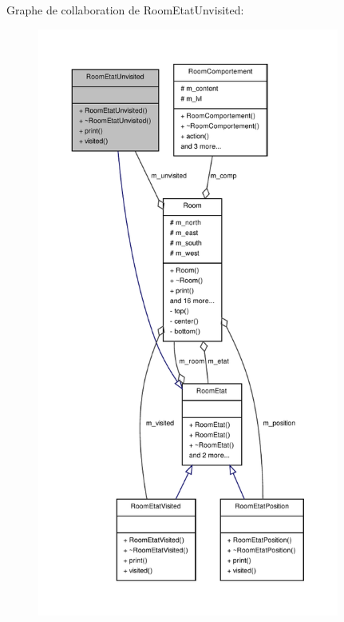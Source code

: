 Graphe de collaboration de Room\-Etat\-Unvisited\-:
\nopagebreak
\begin{figure}[H]
\begin{center}
\leavevmode
\includegraphics[height=550pt]{class_room_etat_unvisited__coll__graph}
\end{center}
\end{figure}

